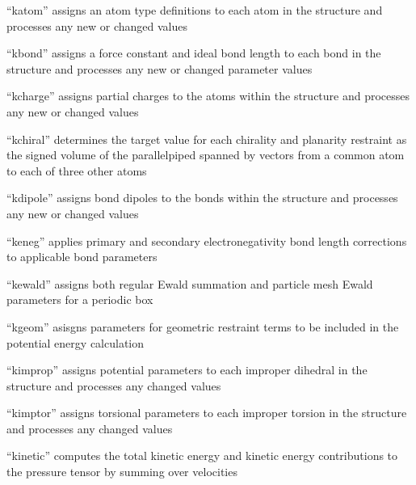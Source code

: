 \documentclass[letterpaper,11pt,english]{sphinxmanual}
\begin{document}

“katom” assigns an atom type definitions to each atom in the structure and processes any new or changed values


“kbond” assigns a force constant and ideal bond length to each bond in the structure and processes any new or changed parameter values


“kcharge” assigns partial charges to the atoms within the structure and processes any new or changed values


“kchiral” determines the target value for each chirality and planarity restraint as the signed volume of the parallelpiped spanned by vectors from a common atom to each of three other atoms


“kdipole” assigns bond dipoles to the bonds within the structure and processes any new or changed values


“keneg” applies primary and secondary electronegativity bond length corrections to applicable bond parameters


“kewald” assigns both regular Ewald summation and particle mesh Ewald parameters for a periodic box


“kgeom” asisgns parameters for geometric restraint terms to be included in the potential energy calculation


“kimprop” assigns potential parameters to each improper dihedral in the structure and processes any changed values


“kimptor” assigns torsional parameters to each improper torsion in the structure and processes any changed values


“kinetic” computes the total kinetic energy and kinetic energy contributions to the pressure tensor by summing over velocities
\end{document}
